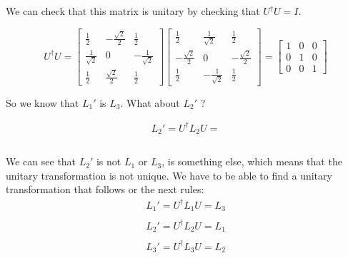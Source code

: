 We can check that this matrix is unitary by checking that $U^{\dagger}U = I$.

\begin{equation}
  U^{\dagger} U = \left[\begin{matrix}
    \frac{1}{2} & -\frac{\sqrt{2}}{2} & \frac{1}{2}\\
    \frac{1}{\sqrt{2}} & 0 & -\frac{1}{\sqrt{2}}\\
    \frac{1}{2} & \frac{\sqrt{2}}{2} & \frac{1}{2}
  \end{matrix}\right] \left[\begin{matrix}
    \frac{1}{2} & \frac{1}{\sqrt{2}} & \frac{1}{2}\\
    -\frac{\sqrt{2}}{2} & 0 & -\frac{\sqrt{2}}{2}\\
    \frac{1}{2} & -\frac{1}{\sqrt{2}} & \frac{1}{2}
  \end{matrix}\right] =
  \left[
    \begin{matrix}
      1 & 0 & 0\\
      0 & 1 & 0\\
      0 & 0 & 1
    \end{matrix}
  \right]
\end{equation}

So we know that $L_1'$ is $L_3$. What about $L_2'$ ?

\begin{equation}
  \begin{array}{c}
    L_2' = U^{\dagger} L_2 U =
    \\

    \\


  \end{array}
\end{equation}


We can see that $L_2'$ is not $L_1$ or $L_3$, is something else, which means that the unitary transformation is not unique. We have to be able to find a unitary transformation that follows or the next rules:
\begin{equation}
  \begin{array}{c}
    L_1' = U^\dagger L_1 U = L_3
    \\

    \\
    L_2' = U^\dagger L_2 U = L_1
    \\

    \\
    L_3' = U^\dagger L_3 U = L_2
  \end{array}
\end{equation}

